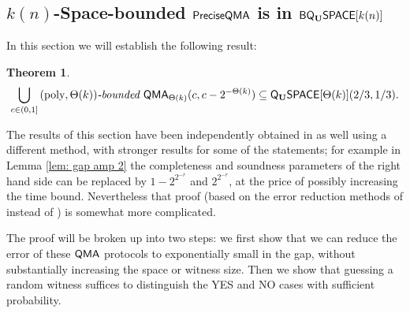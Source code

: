 \documentclass[11pt]{article}
\newtheorem{theorem}{Theorem}
\theoremstyle{definition}
\theoremstyle{remark}
\theoremstyle{definition}
\newcommand\QMA{{\sf{QMA}}}
\newcommand\QMAexp{{\sf{PreciseQMA}}}
\newcommand\bddQMA[5]{{\left(#1,#2\right)}\textit{-bounded }\QMA_{#3}(#4,#5)}
\newcommand{\classfont}{\sf}
\newcommand{\Unitary}{\mathbf{U}}
\newcommand{\unitaryQSPACE}[3]{{\classfont{Q}_\Unitary\classfont{SPACE}}[#1](#2,#3)}
\newcommand{\unitaryBQSPACE}[1]{{\classfont{BQ}_\Unitary\classfont{SPACE}}[#1]}
\newcommand{\poly}{\textrm{poly}}
\begin{document}
\subsection{$k(n)$-Space-bounded $\QMAexp$ is in $\unitaryBQSPACE{k(n)}$} \label{subsec:bddqma-in-bqspace}
In this section we will establish the following result:
\begin{theorem} \label{thm: pspace upper bound}
\[
\bigcup_{c \in (0,1]}\bddQMA{\poly}{\Theta(k)}{\Theta(k)}{c}{c-2^{-\Theta(k)}} \subseteq \unitaryQSPACE{\Theta(k)}{2/3}{1/3}.
\]
\end{theorem}
The results of this section have been independently obtained in \cite{fklmn16} as well using a different method, with stronger results for some of the statements; for example in Lemma \ref{lem: gap amp 2} the completeness and soundness parameters of the right hand side can be replaced by $1-2^{2^{-r}}$ and $2^{2^{-r}}$, at the price of possibly increasing the time bound. Nevertheless that proof (based on the error reduction methods of \cite{kln15} instead of \cite{nwz11}) is somewhat more complicated.

The proof will be broken up into two steps: we first show that we can reduce the error of these $\QMA$ protocols to exponentially small in the gap, without substantially increasing the space or witness size. Then we show that guessing a random witness suffices to distinguish the YES and NO cases with sufficient probability.
\end{document}
